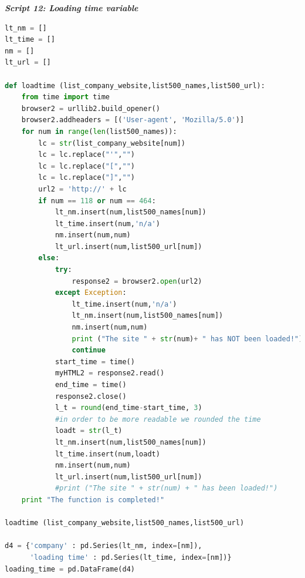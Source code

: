 \documentclass{book}
\begin{document}
\begin{center}
\textit{\textbf{Script 12: Loading time variable}}\label{p12}
\end{center}
\begin{lstlisting}[language=Python]
lt_nm = [] 
lt_time = []
nm = []
lt_url = []

def loadtime (list_company_website,list500_names,list500_url):
    from time import time
    browser2 = urllib2.build_opener()
    browser2.addheaders = [('User-agent', 'Mozilla/5.0')]
    for num in range(len(list500_names)):
        lc = str(list_company_website[num])        
        lc = lc.replace("'","")   
        lc = lc.replace("[","")
        lc = lc.replace("]","")
        url2 = 'http://' + lc
        if num == 118 or num == 464:            
            lt_nm.insert(num,list500_names[num])            
            lt_time.insert(num,'n/a')
            nm.insert(num,num)
            lt_url.insert(num,list500_url[num])           
        else:
            try:
                response2 = browser2.open(url2)
            except Exception:
                lt_time.insert(num,'n/a')
                lt_nm.insert(num,list500_names[num])  
                nm.insert(num,num)
                print ("The site " + str(num)+ " has NOT been loaded!")
                continue     
            start_time = time()
            myHTML2 = response2.read()
            end_time = time()
            response2.close()
            l_t = round(end_time-start_time, 3) 
            #in order to be more readable we rounded the time
            loadt = str(l_t)
            lt_nm.insert(num,list500_names[num])            
            lt_time.insert(num,loadt)
            nm.insert(num,num)
            lt_url.insert(num,list500_url[num])
            #print ("The site " + str(num) + " has been loaded!")
    print "The function is completed!"

loadtime (list_company_website,list500_names,list500_url)

d4 = {'company' : pd.Series(lt_nm, index=[nm]),
      'loading time' : pd.Series(lt_time, index=[nm])}
loading_time = pd.DataFrame(d4)    
\end{lstlisting}
\end{document}
